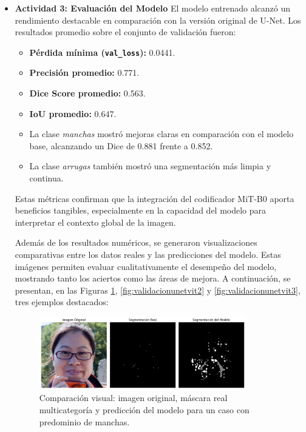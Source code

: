 \begin{enumerate}
\begin{itemize}
\begin{itemize}
    \end{itemize}

  \item\textbf{Actividad 3: Evaluación del Modelo}
  El modelo entrenado alcanzó un rendimiento destacable en comparación con la versión original de U-Net. Los resultados promedio sobre el conjunto de validación fueron:

\begin{itemize}
\item \textbf{Pérdida mínima (\texttt{val\_loss}):} 0.0441.
\item \textbf{Precisión promedio:} 0.771.
\item \textbf{Dice Score promedio:} 0.563.
\item \textbf{IoU promedio:} 0.647.
\item La clase \emph{manchas} mostró mejoras claras en comparación con el modelo base, alcanzando un Dice de 0.881 frente a 0.852.
\item La clase \emph{arrugas} también mostró una segmentación más limpia y continua.

\end{itemize}
Estas métricas confirman que la integración del codificador MiT-B0 aporta beneficios tangibles, especialmente en la capacidad del modelo para interpretar el contexto global de la imagen.



  Además de los resultados numéricos, se generaron visualizaciones comparativas entre los datos reales y las predicciones del modelo. Estas imágenes permiten evaluar cualitativamente el desempeño del modelo, mostrando tanto los aciertos como las áreas de mejora. A continuación, se presentan, en las Figuras \ref{fig:validacionunetvit1}, \ref{fig:validacionunetvit2} y \ref{fig:validacionunetvit3}, tres ejemplos destacados:

  \vspace{0.5cm}
  
  \begin{figure}[H]
  \centering
  \includegraphics[width=0.85\textwidth]{4/figures/unetvit1.jpg}
  \caption{Comparación visual: imagen original, máscara real multicategoría y predicción del modelo para un caso con predominio de manchas.}
  \label{fig:validacionunetvit1}
  \end{figure}
  

\end{itemize}
\end{enumerate}

